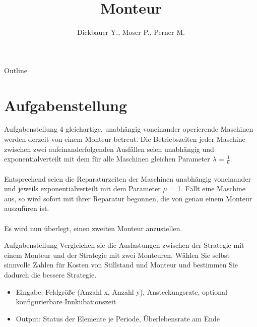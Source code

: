 

\title[BSP28 - Monteur]{Monteur}
\author{Dickbauer Y., Moser P., Perner M.}



\begin{frame}
  \titlepage
\end{frame}

\begin{frame}{Outline}
  \tableofcontents
\end{frame}

\section{Aufgabenstellung}
\begin{frame}{Aufgabenstellung}
4 gleichartige, unabhängig voneinander operierende Maschinen werden derzeit von einem
Monteur betreut. Die Betriebszeiten jeder Maschine zwischen zwei aufeinanderfolgenden
Ausfällen seien unabhängig und exponentialverteilt mit dem für alle Maschinen gleichen
Parameter $\lambda$ = $\frac{1}{6}$.
\\~\\
Entsprechend seien die Reparaturzeiten der Maschinen unabhängig
voneinander und jeweils exponentialverteilt mit dem Parameter $\mu$ = 1. Fällt eine Maschine
aus, so wird sofort mit ihrer Reparatur begonnen, die von genau einem Monteur
auszufüren ist.
\\~\\
Es wird nun überlegt, einen zweiten Monteur anzustellen.
\end{frame}

\begin{frame}{Aufgabenstellung}
Vergleichen sie die Auslastungen zwischen der Strategie mit einem Monteur und der Strategie
mit zwei Monteuren. Wählen Sie selbst sinnvolle Zahlen für Kosten von Stillstand
und Monteur und bestimmen Sie dadurch die bessere Strategie.
\vspace{1cm}
\begin{itemize}
  \item Eingabe: Feldgröße (Anzahl x, Anzahl y), Ansteckungsrate, optional konfigurierbare Innkubationszeit
  \item Output: Status der Elemente je Periode, Überlebensrate am Ende
\end{itemize}
\end{frame}


%


